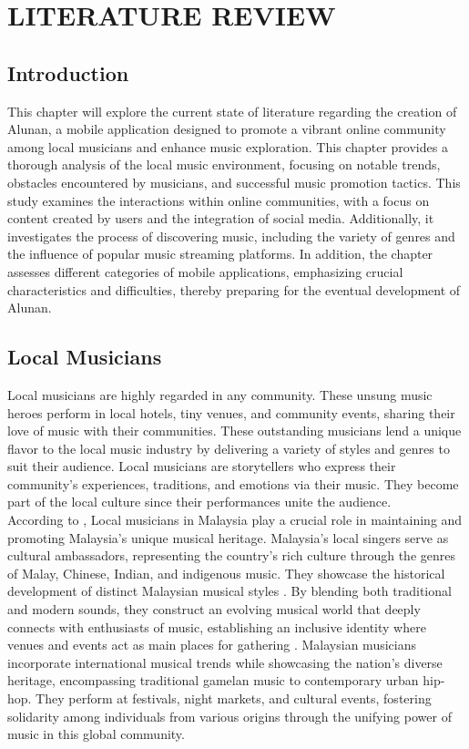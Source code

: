 \chapter{LITERATURE REVIEW}
\label{ch:litreview}

\section{Introduction}
This chapter will explore the current state of literature regarding the creation of Alunan, a mobile application designed to promote a vibrant online community among local musicians and enhance music exploration. This chapter provides a thorough analysis of the local music environment, focusing on notable trends, obstacles encountered by musicians, and successful music promotion tactics. This study examines the interactions within online communities, with a focus on content created by users and the integration of social media. Additionally, it investigates the process of discovering music, including the variety of genres and the influence of popular music streaming platforms. In addition, the chapter assesses different categories of mobile applications, emphasizing crucial characteristics and difficulties, thereby preparing for the eventual development of Alunan.

\section{Local Musicians}
Local musicians are highly regarded in any community. These unsung music heroes perform in local hotels, tiny venues, and community events, sharing their love of music with their communities. These outstanding musicians lend a unique flavor to the local music industry by delivering a variety of styles and genres to suit their audience. Local musicians are storytellers who express their community's experiences, traditions, and emotions via their music. They become part of the local culture since their performances unite the audience. \\

According to \textcite{mohd21}, Local musicians in Malaysia play a crucial role in maintaining and promoting Malaysia's unique musical heritage. Malaysia's local singers serve as cultural ambassadors, representing the country's rich culture through the genres of Malay, Chinese, Indian, and indigenous music. They showcase the historical development of distinct Malaysian musical styles \parencite{mohd21}. By blending both traditional and modern sounds, they construct an evolving musical world that deeply connects with enthusiasts of music, establishing an inclusive identity where venues and events act as main places for gathering \parencite{ong19}. Malaysian musicians incorporate international musical trends while showcasing the nation's diverse heritage, encompassing traditional gamelan music to contemporary urban hip-hop. They perform at festivals, night markets, and cultural events, fostering solidarity among individuals from various origins through the unifying power of music in this global community. 

